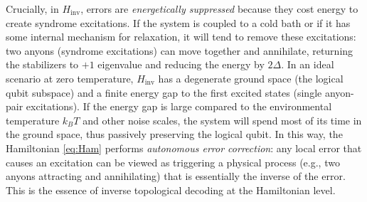 \documentclass[11pt]{article}
\begin{document}
Crucially, in $H_{\mathrm{inv}}$, errors are \emph{energetically suppressed} because they cost energy to create syndrome excitations. If the system is coupled to a cold bath or if it has some internal mechanism for relaxation, it will tend to remove these excitations: two anyons (syndrome excitations) can move together and annihilate, returning the stabilizers to $+1$ eigenvalue and reducing the energy by $2\Delta$. In an ideal scenario at zero temperature, $H_{\mathrm{inv}}$ has a degenerate ground space (the logical qubit subspace) and a finite energy gap to the first excited states (single anyon-pair excitations). If the energy gap is large compared to the environmental temperature $k_B T$ and other noise scales, the system will spend most of its time in the ground space, thus passively preserving the logical qubit. In this way, the Hamiltonian \eqref{eq:Ham} performs \emph{autonomous error correction}: any local error that causes an excitation can be viewed as triggering a physical process (e.g., two anyons attracting and annihilating) that is essentially the inverse of the error. This is the essence of inverse topological decoding at the Hamiltonian level.
\end{document}
